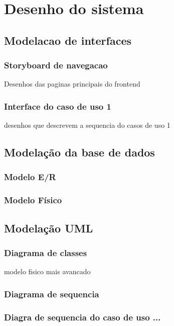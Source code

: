 \chapter{Desenho do sistema}
\label{cap3}

\section{Modelacao de interfaces}

\subsection{Storyboard de navegacao}

Desenhos das paginas principais do frontend

\subsection{Interface do caso de uso 1}

desenhos que descrevem a sequencia do casos de uso 1

\section{Modelação da base de dados}

\subsection{Modelo E/R}

\subsection{Modelo Físico}

\section{Modelação UML}

\subsection{Diagrama de classes}

modelo fisico mais avancado

\subsection{Diagrama de sequencia}

\subsection{Diagra de sequencia do caso de uso ...}
